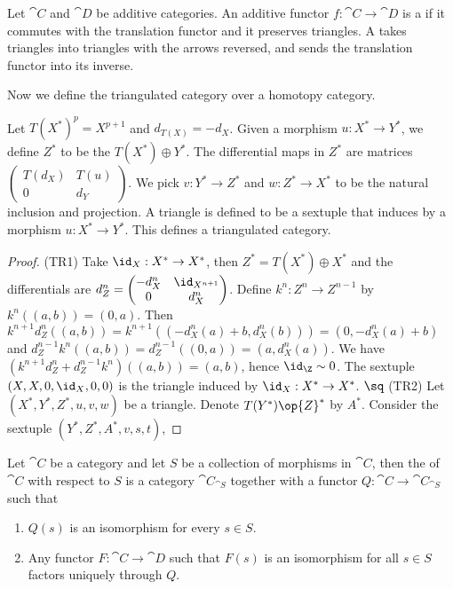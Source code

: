 \begin{definition}
    Let $\cat{C}$ and $\cat{D}$ be additive categories. An additive functor $f:\cat{C}\to\cat{D}$ is a  if it commutes with the translation functor and it preserves triangles. A  takes triangles into triangles with the arrows reversed, and sends the translation functor into its inverse.
\end{definition}
Now we define the triangulated category over a homotopy category.
\begin{proposition}
    Let $T{({X}^{*})}^{p}={X}^{p+1}$ and ${d}_{T(X)}=-{d}_{X}$. Given a morphism $u:{X}^{*}\to{Y}^{*}$, we define ${Z}^{*}$ to be the  $T({X}^{*})\oplus{Y}^{*}$. The differential maps in ${Z}^{*}$ are matrices $\begin{pmatrix}
        T({d}_{X}) & T(u) \\
        0 & {d}_{Y}
    \end{pmatrix}$. We pick $v:{Y}^{*}\to{Z}^{*}$ and $w:{Z}^{*}\to{X}^{*}$ to be the natural inclusion and projection. A triangle is defined to be a sextuple that induces by a morphism $u:{X}^{*}\to{Y}^{*}$. This defines a triangulated category.
\end{proposition}
\begin{proof}
    (TR1) Take ${\id}_{X}:{X}^{*}\to{X}^{*}$, then ${Z}^{*}=T({X}^{*})\oplus{X}^{*}$ and the differentials are ${d}_{Z}^{n}=\begin{pmatrix}
        -{d}_{X}^{n} & {\id}_{{X}^{n+1}} \\
        0 & {d}_{X}^{n}
    \end{pmatrix}$. Define ${k}^{n}:{Z}^{n}\to{Z}^{n-1}$ by ${k}^{n}((a,b))=(0,a)$. Then ${k}^{n+1}{d}_{Z}^{n}((a,b))={k}^{n+1}((-{d}_{X}^{n}(a)+b,{d}_{X}^{n}(b)))=(0,-{d}_{X}^{n}(a)+b)$ and ${d}_{Z}^{n-1}{k}^{n}((a,b))={d}_{Z}^{n-1}((0,a))=(a,{d}_{X}^{n}(a))$. We have $({k}^{n+1}{d}_{Z}^{n}+{d}_{Z}^{n-1}{k}^{n})((a,b))=(a,b)$, hence ${\id}_{\Z}\sim 0$. The sextuple $(X,X,0,{\id}_{X},0,0)$ is the triangle induced by ${\id}_{X}:{X}^{*}\to{X}^{*}$. $\sq$ (TR2) Let $({X}^{*},{Y}^{*},{Z}^{*},u,v,w)$ be a triangle. Denote $T({Y}^{*})\op{Z}^{*}$ by ${A}^{*}$. Consider the sextuple $({Y}^{*},{Z}^{*},{A}^{*},v,s,t)$, 
\end{proof}
\begin{definition}
    Let $\cat{C}$ be a category and let $S$ be a collection of morphisms in $\cat{C}$, then the  of $\cat{C}$ with respect to $S$ is a category ${\cat{C}}_{\cat{S}}$ together with a functor $Q:\cat{C}\to{\cat{C}}_{\cat{S}}$ such that 
    \begin{enumerate}
        \item $Q(s)$ is an isomorphism for every $s\in S$.
        \item Any functor $F:\cat{C}\to\cat{D}$ such that $F(s)$ is an isomorphism for all $s\in S$ factors uniquely through $Q$.
    \end{enumerate}
\end{definition}
